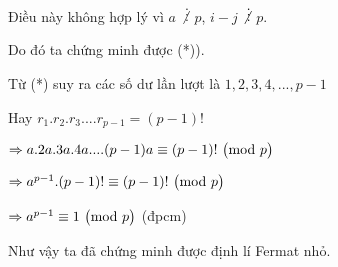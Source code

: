 Điều này không hợp lý vì $a$ $\not \vdots$ $p$, $i - j$ $\not \vdots$ $p$.

Do đó ta chứng minh được (*)\big).

Từ (*) suy ra các số dư lần lượt là $1, 2, 3, 4,...,p-1$

Hay $r_1.r_2.r_3....r_{p-1} = (p-1)!$

$\Rightarrow a.2a.3a.4a....(p-1)a \equiv (p-1)! \ \big( \mathrm{mod}\ p \big)$

$\Rightarrow a^{p-1}.(p-1)! \equiv (p-1)! \ \big( \mathrm{mod}\ p \big)$

$\Rightarrow a^{p-1} \equiv 1 \ \big( \mathrm{mod}\ p \big)$ (đpcm)

Như vậy ta đã chứng minh được định lí Fermat nhỏ.
\clearpage